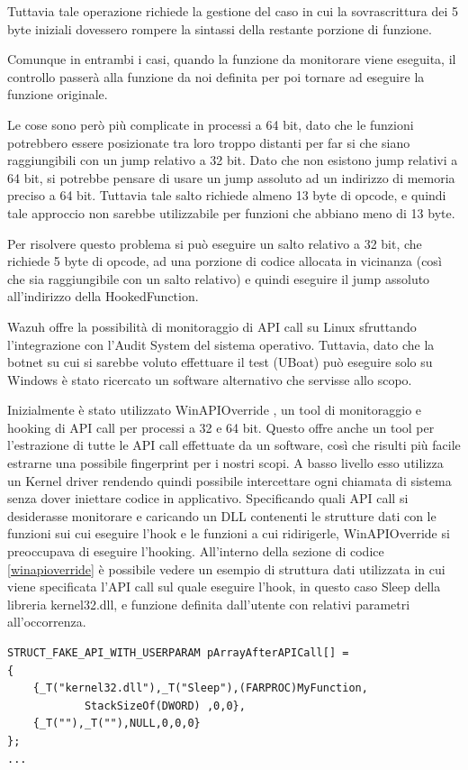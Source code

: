 Tuttavia tale operazione richiede la gestione del caso in cui la sovrascrittura dei 5 byte iniziali dovessero rompere la sintassi della restante porzione di funzione.

Comunque in entrambi i casi, quando la funzione da monitorare viene eseguita, il controllo passerà alla funzione da noi definita per poi tornare ad eseguire la funzione originale.

Le cose sono però più complicate in processi a 64 bit, dato che le funzioni potrebbero essere posizionate tra loro troppo distanti per far si che siano raggiungibili con un jump relativo a 32 bit. Dato che non esistono jump relativi a 64 bit, si potrebbe pensare di usare un jump assoluto ad un indirizzo di memoria preciso a 64 bit.  Tuttavia tale salto richiede almeno 13 byte di opcode, e quindi tale approccio non sarebbe utilizzabile per funzioni che abbiano meno di 13 byte.

Per risolvere questo problema si può eseguire un salto relativo a 32 bit, che richiede 5 byte di opcode, ad una porzione di codice allocata in  vicinanza (così che sia raggiungibile con un salto relativo) e quindi eseguire il jump assoluto all'indirizzo della HookedFunction.

\smallskip


Wazuh offre la possibilità di monitoraggio di API call su Linux sfruttando l'integrazione con l'Audit System del sistema operativo. Tuttavia, dato che la botnet su cui si sarebbe voluto effettuare il test (UBoat) può eseguire solo su Windows è stato ricercato un software alternativo che servisse allo scopo.

Inizialmente è stato utilizzato WinAPIOverride \cite{winapioverride}, un tool di monitoraggio e hooking di API call per processi a 32 e 64 bit.
Questo offre anche un tool per l'estrazione di tutte le API call effettuate da un software, così che risulti più facile estrarne una possibile fingerprint per i nostri scopi.
A basso livello esso utilizza un Kernel driver rendendo quindi possibile intercettare ogni chiamata di sistema senza dover iniettare codice in applicativo.
Specificando quali API call si desiderasse monitorare e caricando un DLL contenenti le strutture dati con le funzioni sui cui eseguire l'hook e le funzioni a cui ridirigerle, WinAPIOverride si preoccupava di eseguire l'hooking.
All'interno della sezione di codice \ref{winapioverride} è possibile vedere un esempio di struttura dati utilizzata in cui viene specificata l'API call sul quale eseguire l'hook, in questo caso Sleep della libreria kernel32.dll, e funzione definita dall'utente con relativi parametri all'occorrenza.
\lstset{xleftmargin=0cm}
\begin{lstlisting}[frame=single,caption={esempio di struttura dati per hook in WinAPIOverride.},captionpos=b,label={winapioverride}]
STRUCT_FAKE_API_WITH_USERPARAM pArrayAfterAPICall[] =
{    
	{_T("kernel32.dll"),_T("Sleep"),(FARPROC)MyFunction,
            StackSizeOf(DWORD) ,0,0},
	{_T(""),_T(""),NULL,0,0,0}
};
...
\end{lstlisting}

